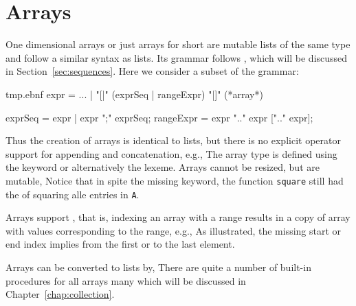 \section{Arrays}
\label{sec:arrays}
One dimensional arrays or just arrays for short are mutable lists of the same type and follow a similar syntax as lists. Its grammar follows , which will be discussed in Section~\ref{sec:sequences}. Here we consider a subset of the grammar:
%
\begin{verbatimwrite}{tmp.ebnf}
expr = ... 
  | "[|" (exprSeq | rangeExpr) "|]" (*array*)

exprSeq =  expr | expr ";" exprSeq;
rangeExpr = expr ".." expr [".." expr];
\end{verbatimwrite}
%
Thus the creation of arrays is identical to lists, but there is no explicit operator support for appending and concatenation, e.g.,
%
%
The array type is defined using the  keyword or alternatively the \keyword{[]} lexeme. Arrays cannot be resized, but are mutable,
%
%
Notice that in spite the missing  keyword, the function \lstinline{square} still had the  of squaring alle entries in \lstinline{A}.  

Arrays support , that is, indexing an array with a range results in a copy of array with values corresponding to the range, e.g.,
%
%
As illustrated, the missing start or end index implies from the first or to the last element.

Arrays can be converted to lists by,
%
%
There are quite a number of built-in procedures for all arrays many which will be discussed in Chapter~\ref{chap:collection}.

